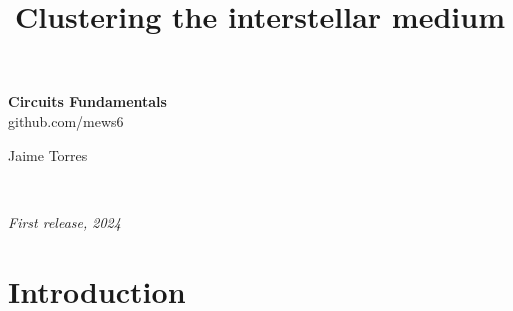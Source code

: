 \documentclass[11pt,fleqn]{book} %
\begin{document}
\title{Clustering the interstellar medium}


\begingroup
\thispagestyle{empty}
\centering
\vspace*{5cm}
\par\normalfont\fontsize{35}{35}\sffamily\selectfont
\textbf{Circuits Fundamentals}\\
{\LARGE github.com/mews6}\par %
\vspace*{1cm}
{Jaime Torres}\par %
\endgroup


\newpage
~\vfill
\thispagestyle{empty}

\noindent \textit{First release, 2024} %



\pagestyle{empty} %

\tableofcontents %


\pagestyle{fancy} %



\chapter{Introduction}
\end{document}
